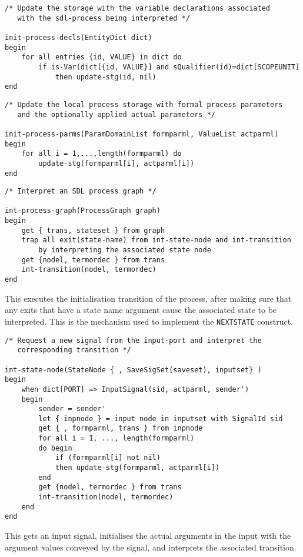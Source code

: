 \begin{verbatim}
/* Update the storage with the variable declarations associated
   with the sdl-process being interpreted */

init-process-decls(EntityDict dict)
begin
    for all entries {id, VALUE} in dict do
        if is-Var(dict[{id, VALUE}] and sQualifier(id)=dict[SCOPEUNIT]
            then update-stg(id, nil)
end
\end{verbatim}

\begin{verbatim}
/* Update the local process storage with formal process parameters
   and the optionally applied actual parameters */

init-process-parms(ParamDomainList formparml, ValueList actparml)
begin
    for all i = 1,...,length(formparml) do
        update-stg(formparml[i], actparml[i])
end
\end{verbatim}

\begin{verbatim}
/* Interpret an SDL process graph */

int-process-graph(ProcessGraph graph)
begin
    get { trans, stateset } from graph
    trap all exit(state-name) from int-state-node and int-transition
        by interpreting the associated state node
    get {nodel, termordec } from trans
    int-transition(nodel, termordec)
end
\end{verbatim}

This executes the initialisation transition of the process, after
making sure that any exits that have a state name argument cause the
associated state to be interpreted. This is the mechanism used to
implement the {\tt NEXTSTATE} construct.

\begin{verbatim}
/* Request a new signal from the input-port and interpret the
   corresponding transition */

int-state-node(StateNode { , SaveSigSet(saveset), inputset} )
begin
    when dict[PORT] => InputSignal(sid, actparml, sender')
    begin
        sender = sender'
        let { inpnode } = input node in inputset with SignalId sid
        get { , formparml, trans } from inpnode
        for all i = 1, ..., length(formparml)
        do begin
            if (formparml[i] not nil)
            then update-stg(formparml, actparml[i])
        end
        get {nodel, termordec } from trans
        int-transition(nodel, termordec)
    end
end
\end{verbatim}

This gets an input signal, initialises the actual arguments in the 
input with the argument values conveyed by the signal, and
interprets the associated transition.

